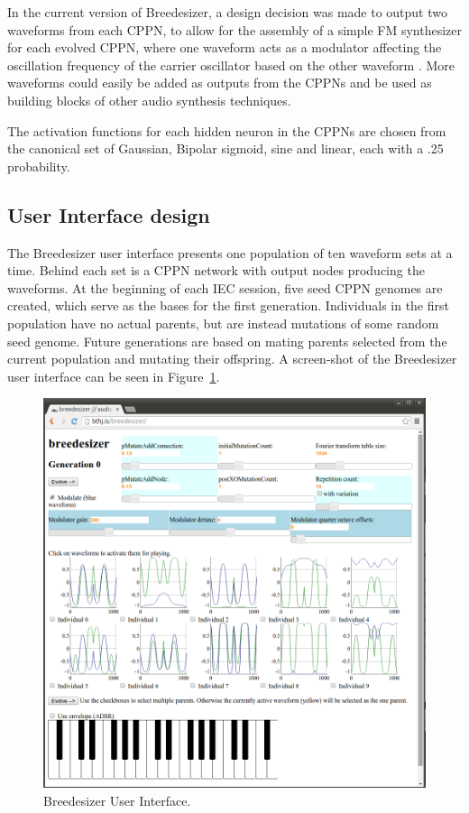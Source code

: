 \documentclass[conference]{IEEEtran}
\begin{document}
In the current version of Breedesizer, a design decision was made to output two waveforms from each CPPN, to allow for the assembly of a simple FM synthesizer for each evolved CPPN, where one waveform acts as a modulator affecting the oscillation frequency of the carrier oscillator based on the other waveform \cite{FM-with-Web-Audio-API}.  More waveforms could easily be added as outputs from the CPPNs and be used as building blocks of other audio synthesis techniques.

The activation functions for each hidden neuron in the CPPNs are chosen from the canonical set of Gaussian, Bipolar sigmoid, sine and linear, each with a .25 probability.


\subsection{User Interface design}
\label{sec:UserInterfaceDesign}

The Breedesizer user interface presents one population of ten waveform sets at a time.  Behind each set is a CPPN network with output nodes producing the waveforms.  At the beginning of each IEC session, five seed CPPN genomes are created, which serve as the bases for the first generation.  Individuals in the first population have no actual parents, but are instead mutations of some random seed genome.  Future generations are based on mating parents selected from the current population and mutating their offspring.  A screen-shot of the Breedesizer user interface can be seen in Figure~\ref{fig:BreedesizerUI}.


\begin{figure}[htp]
	\centerline{\includegraphics[width=1\columnwidth]{breedesizerUI.png}}
	\caption{Breedesizer User Interface.}
	\label{fig:BreedesizerUI}
\end{figure}
\end{document}
